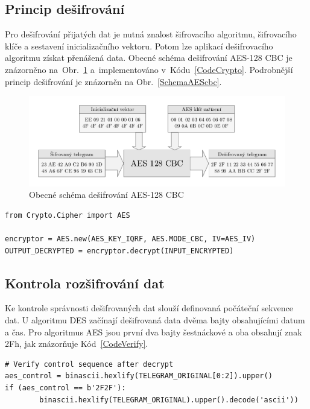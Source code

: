 \subsection{Princip dešifrování}
Pro dešifrování přijatých dat je nutná znalost šifrovacího algoritmu, šifrovacího klíče a sestavení inicializačního vektoru. Potom lze aplikací dešifrovacího algoritmu získat přenášená data. Obecné schéma dešifrování AES-128 CBC je znázorněno na~Obr.~\ref{SchemaAESobecne} a~implementováno v~Kódu~\ref{CodeCrypto}. Podrobnější princip dešifrování je znázorněn na Obr.~\ref{SchemaAEScbc}.

\begin{figure}[!ht]
\vspace{-10pt}
 \begin{center}
    \includegraphics[scale=0.8]{obrazky/wmbus_aes_schema}
  \end{center}
	\vspace{-30pt}
  \caption{Obecné schéma dešifrování AES-128 CBC}
	\label{SchemaAESobecne}
	\vspace{-20pt}
\end{figure}

\begin{lstlisting}[caption={Implementace AES},captionpos=b,label=CodeCrypto,style=MyCodePython]
from Crypto.Cipher import AES

encryptor = AES.new(AES_KEY_IQRF, AES.MODE_CBC, IV=AES_IV)
OUTPUT_DECRYPTED = encryptor.decrypt(INPUT_ENCRYPTED)
\end{lstlisting}

\subsection{Kontrola rozšifrování dat}
Ke kontrole správnosti dešifrovaných dat slouží definovaná počáteční sekvence dat. U algoritmu DES začínají dešifrovaná data dvěma bajty obsahujícími datum a čas. Pro algoritmus AES jsou první dva bajty šestnáckové a oba obsahují znak 2Fh, jak znázorňuje Kód~\ref{CodeVerify}.

\begin{lstlisting}[caption={Ověření kontrolní sekvence AES},captionpos=b,label=CodeVerify,style=MyCodePython]
# Verify control sequence after decrypt
aes_control = binascii.hexlify(TELEGRAM_ORIGINAL[0:2]).upper()
if (aes_control == b'2F2F'):
		binascii.hexlify(TELEGRAM_ORIGINAL).upper().decode('ascii'))
\end{lstlisting}

